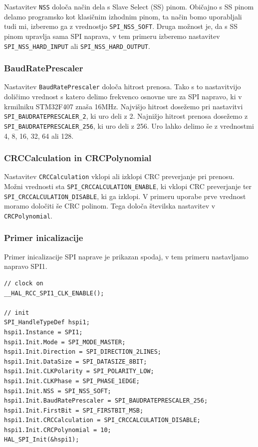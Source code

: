 \documentclass[12pt,letterpaper]{article}
\begin{document}
Nastavitev \texttt{NSS} določa način dela s Slave Select (SS) pinom. Običajno s SS pinom delamo programsko kot klasičnim izhodnim pinom, ta način bomo uporabljali tudi mi, izberemo ga z vrednostjo \texttt{SPI\_NSS\_SOFT}. Druga možnost je, da s SS pinom upravlja sama SPI naprava, v tem primeru izberemo nastavitev \texttt{SPI\_NSS\_HARD\_INPUT} ali \texttt{SPI\_NSS\_HARD\_OUTPUT}.

\subsubsection*{BaudRatePrescaler}

Nastavitev \texttt{BaudRatePrescaler} določa hitrost prenosa. Tako s to nastavitvijo doličimo vrednost s katero delimo frekvenco osnovne ure za SPI napravo, ki v krmilniku STM32F407 znaša 16MHz. Najvišjo hitrost dosežemo pri nastavitvi \texttt{SPI\_BAUDRATEPRESCALER\_2}, ki uro deli z 2. Najnižjo hitrost prenosa dosežemo z \texttt{SPI\_BAUDRATEPRESCALER\_256}, ki uro deli z 256. Uro lahko delimo še z vrednostmi 4, 8, 16, 32, 64 ali 128.

\subsubsection*{CRCCalculation in CRCPolynomial}

Nastavitev \texttt{CRCCalculation} vklopi ali izklopi CRC preverjanje pri prenosu. Možni vrednosti sta \texttt{SPI\_CRCCALCULATION\_ENABLE}, ki vklopi CRC preverjanje ter \texttt{SPI\_CRCCALCULATION\_DISABLE}, ki ga izklopi. V primeru uporabe prve vrednost moramo določiti še CRC polinom. Tega določa številska nastavitev v \texttt{CRCPolynomial}.


\subsubsection*{Primer inicalizacije}

Primer inicalizacije SPI naprave je prikazan spodaj, v tem primeru nastavljamo napravo SPI1.

\begin{center}
\begin{lstlisting}[style=CStyle]
// clock on
__HAL_RCC_SPI1_CLK_ENABLE();

// init
SPI_HandleTypeDef hspi1;
hspi1.Instance = SPI1;
hspi1.Init.Mode = SPI_MODE_MASTER;
hspi1.Init.Direction = SPI_DIRECTION_2LINES;
hspi1.Init.DataSize = SPI_DATASIZE_8BIT;
hspi1.Init.CLKPolarity = SPI_POLARITY_LOW;
hspi1.Init.CLKPhase = SPI_PHASE_1EDGE;
hspi1.Init.NSS = SPI_NSS_SOFT;
hspi1.Init.BaudRatePrescaler = SPI_BAUDRATEPRESCALER_256;
hspi1.Init.FirstBit = SPI_FIRSTBIT_MSB;
hspi1.Init.CRCCalculation = SPI_CRCCALCULATION_DISABLE;
hspi1.Init.CRCPolynomial = 10;
HAL_SPI_Init(&hspi1);
\end{lstlisting}
\end{center}
\end{document}

